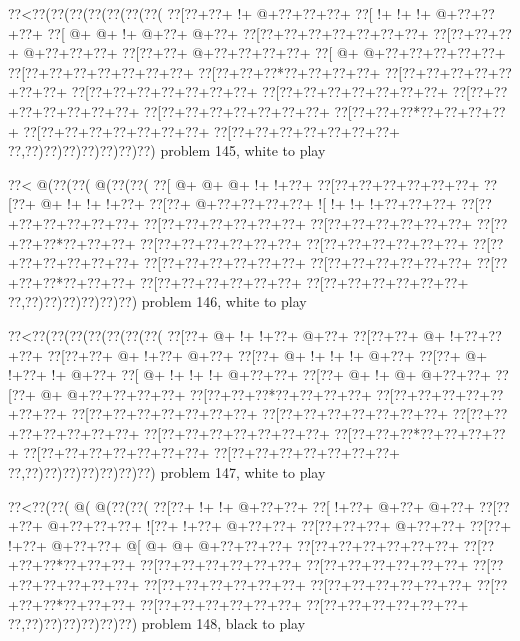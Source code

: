 \vbox{\vbox{\goo
\0??<\0??(\0??(\0??(\0??(\0??(\0??(\0??(
\0??[\0??+\0??+\- !+\- @+\0??+\0??+\0??+
\0??[\- !+\- !+\- !+\- @+\0??+\0??+\0??+
\0??[\- @+\- @+\- !+\- @+\0??+\- @+\0??+
\0??[\0??+\0??+\0??+\0??+\0??+\0??+\0??+
\0??[\0??+\0??+\0??+\- @+\0??+\0??+\0??+
\0??[\0??+\0??+\- @+\0??+\0??+\0??+\0??+
\0??[\- @+\- @+\0??+\0??+\0??+\0??+\0??+
\0??[\0??+\0??+\0??+\0??+\0??+\0??+\0??+
\0??[\0??+\0??+\0??*\0??+\0??+\0??+\0??+
\0??[\0??+\0??+\0??+\0??+\0??+\0??+\0??+
\0??[\0??+\0??+\0??+\0??+\0??+\0??+\0??+
\0??[\0??+\0??+\0??+\0??+\0??+\0??+\0??+
\0??[\0??+\0??+\0??+\0??+\0??+\0??+\0??+
\0??[\0??+\0??+\0??+\0??+\0??+\0??+\0??+
\0??[\0??+\0??+\0??*\0??+\0??+\0??+\0??+
\0??[\0??+\0??+\0??+\0??+\0??+\0??+\0??+
\0??[\0??+\0??+\0??+\0??+\0??+\0??+\0??+
\0??,\0??)\0??)\0??)\0??)\0??)\0??)\0??)
}
\hfil problem 145, white to play\hfil\break
}

\vbox{\vbox{\goo
\0??<\- @(\0??(\0??(\- @(\0??(\0??(
\0??[\- @+\- @+\- @+\- !+\- !+\0??+
\0??[\0??+\0??+\0??+\0??+\0??+\0??+
\0??[\0??+\- @+\- !+\- !+\- !+\0??+
\0??[\0??+\- @+\0??+\0??+\0??+\0??+
\- ![\- !+\- !+\- !+\0??+\0??+\0??+
\0??[\0??+\0??+\0??+\0??+\0??+\0??+
\0??[\0??+\0??+\0??+\0??+\0??+\0??+
\0??[\0??+\0??+\0??+\0??+\0??+\0??+
\0??[\0??+\0??+\0??*\0??+\0??+\0??+
\0??[\0??+\0??+\0??+\0??+\0??+\0??+
\0??[\0??+\0??+\0??+\0??+\0??+\0??+
\0??[\0??+\0??+\0??+\0??+\0??+\0??+
\0??[\0??+\0??+\0??+\0??+\0??+\0??+
\0??[\0??+\0??+\0??+\0??+\0??+\0??+
\0??[\0??+\0??+\0??*\0??+\0??+\0??+
\0??[\0??+\0??+\0??+\0??+\0??+\0??+
\0??[\0??+\0??+\0??+\0??+\0??+\0??+
\0??,\0??)\0??)\0??)\0??)\0??)\0??)
}
\hfil problem 146, white to play\hfil\break
}

\vbox{\vbox{\goo
\0??<\0??(\0??(\0??(\0??(\0??(\0??(\0??(
\0??[\0??+\- @+\- !+\- !+\0??+\- @+\0??+
\0??[\0??+\0??+\- @+\- !+\0??+\0??+\0??+
\0??[\0??+\0??+\- @+\- !+\0??+\- @+\0??+
\0??[\0??+\- @+\- !+\- !+\- !+\- @+\0??+
\0??[\0??+\- @+\- !+\0??+\- !+\- @+\0??+
\0??[\- @+\- !+\- !+\- !+\- @+\0??+\0??+
\0??[\0??+\- @+\- !+\- @+\- @+\0??+\0??+
\0??[\0??+\- @+\- @+\0??+\0??+\0??+\0??+
\0??[\0??+\0??+\0??*\0??+\0??+\0??+\0??+
\0??[\0??+\0??+\0??+\0??+\0??+\0??+\0??+
\0??[\0??+\0??+\0??+\0??+\0??+\0??+\0??+
\0??[\0??+\0??+\0??+\0??+\0??+\0??+\0??+
\0??[\0??+\0??+\0??+\0??+\0??+\0??+\0??+
\0??[\0??+\0??+\0??+\0??+\0??+\0??+\0??+
\0??[\0??+\0??+\0??*\0??+\0??+\0??+\0??+
\0??[\0??+\0??+\0??+\0??+\0??+\0??+\0??+
\0??[\0??+\0??+\0??+\0??+\0??+\0??+\0??+
\0??,\0??)\0??)\0??)\0??)\0??)\0??)\0??)
}
\hfil problem 147, white to play\hfil\break
}

\vbox{\vbox{\goo
\0??<\0??(\0??(\- @(\- @(\0??(\0??(
\0??[\0??+\- !+\- !+\- @+\0??+\0??+
\0??[\- !+\0??+\- @+\0??+\- @+\0??+
\0??[\0??+\0??+\- @+\0??+\0??+\0??+
\- ![\0??+\- !+\0??+\- @+\0??+\0??+
\0??[\0??+\0??+\0??+\- @+\0??+\0??+
\0??[\0??+\- !+\0??+\- @+\0??+\0??+
\- @[\- @+\- @+\- @+\0??+\0??+\0??+
\0??[\0??+\0??+\0??+\0??+\0??+\0??+
\0??[\0??+\0??+\0??*\0??+\0??+\0??+
\0??[\0??+\0??+\0??+\0??+\0??+\0??+
\0??[\0??+\0??+\0??+\0??+\0??+\0??+
\0??[\0??+\0??+\0??+\0??+\0??+\0??+
\0??[\0??+\0??+\0??+\0??+\0??+\0??+
\0??[\0??+\0??+\0??+\0??+\0??+\0??+
\0??[\0??+\0??+\0??*\0??+\0??+\0??+
\0??[\0??+\0??+\0??+\0??+\0??+\0??+
\0??[\0??+\0??+\0??+\0??+\0??+\0??+
\0??,\0??)\0??)\0??)\0??)\0??)\0??)
}
\hfil problem 148, black to play\hfil\break
}

